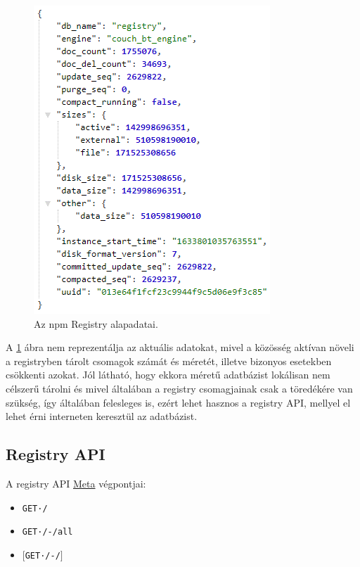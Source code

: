 \begin{figure}[h]
	\centering
	\includegraphics[scale=0.75]{images/registry_data.png}
	\caption{Az npm Registry alapadatai.}
	\label{fig:registry}
\end{figure}

A \ref{fig:registry} ábra nem reprezentálja az aktuális adatokat, mivel a közösség aktívan növeli a registryben tárolt csomagok számát és méretét, illetve bizonyos esetekben csökkenti azokat. Jól látható, hogy ekkora méretű adatbázist lokálisan nem célszerű tárolni és mivel általában a registry csomagjainak csak a töredékére van szükség, így általában felesleges is, ezért lehet hasznos a registry API, mellyel el lehet érni interneten keresztül az adatbázist.\\

\begin{flushright}
	\cite{npm-registry}
\end{flushright}

\subsection{Registry API}

A registry API \underline{Meta} végpontjai:

\begin{itemize}
	\item \texttt{GET·/}
	\item \texttt{GET·/-/all}
	\item \texttt{$\big[$GET·/-/$\big]$}
\end{itemize}

